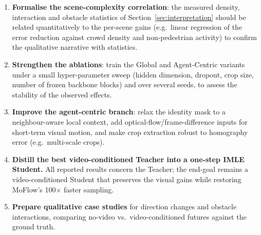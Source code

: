\documentclass[11pt,a4paper]{article}
\begin{document}
\begin{enumerate}
    \item \textbf{Formalise the scene-complexity correlation}: the measured
          density, interaction and obstacle statistics of
          Section~\ref{sec:interpretation} should be related quantitatively to
          the per-scene gains (e.g.\ linear regression of the error reduction
          against crowd density and non-pedestrian activity) to confirm the
          qualitative narrative with statistics.
    \item \textbf{Strengthen the ablations}: train the Global and Agent-Centric
          variants under a small hyper-parameter sweep (hidden dimension,
          dropout, crop size, number of frozen backbone blocks) and over
          several seeds, to assess the stability of the observed effects.
    \item \textbf{Improve the agent-centric branch}: relax the identity mask to a
          neighbour-aware local context, add optical-flow/frame-difference
          inputs for short-term visual motion, and make crop extraction robust
          to homography error (e.g.\ multi-scale crops).
    \item \textbf{Distill the best video-conditioned Teacher into a one-step
          IMLE Student.} All reported results concern the Teacher; the
          end-goal remains a video-conditioned Student that preserves the
          visual gains while restoring MoFlow's 100$\times$ faster sampling.
    \item \textbf{Prepare qualitative case studies} for direction changes and
          obstacle interactions, comparing no-video vs.\ video-conditioned
          futures against the ground truth.
\end{enumerate}
\end{document}
